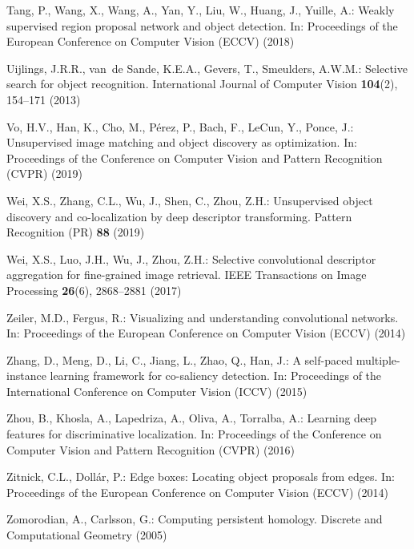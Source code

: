 \documentclass[runningheads]{llncs}
\begin{document}
\begin{thebibliography}{10}
Tang, P., Wang, X., Wang, A., Yan, Y., Liu, W., Huang, J., Yuille, A.: Weakly
  supervised region proposal network and object detection. In: Proceedings of
  the European Conference on Computer Vision ({ECCV}) (2018)

Uijlings, J.R.R., van~de Sande, K.E.A., Gevers, T., Smeulders, A.W.M.:
  Selective search for object recognition. International Journal of Computer
  Vision  \textbf{104}(2),  154--171 (2013)

Vo, H.V., Han, K., Cho, M., P{\'e}rez, P., Bach, F., LeCun, Y., Ponce, J.:
  Unsupervised image matching and object discovery as optimization. In:
  Proceedings of the Conference on Computer Vision and Pattern Recognition
  ({CVPR}) (2019)

Wei, X.S., Zhang, C.L., Wu, J., Shen, C., Zhou, Z.H.: Unsupervised object
  discovery and co-localization by deep descriptor transforming. Pattern
  Recognition (PR)  \textbf{88} (2019)

Wei, X.S., Luo, J.H., Wu, J., Zhou, Z.H.: Selective convolutional descriptor
  aggregation for fine-grained image retrieval. {IEEE} Transactions on Image
  Processing  \textbf{26}(6),  2868–2881 (2017)

Zeiler, M.D., Fergus, R.: Visualizing and understanding convolutional networks.
  In: Proceedings of the European Conference on Computer Vision ({ECCV}) (2014)

Zhang, D., Meng, D., Li, C., Jiang, L., Zhao, Q., Han, J.: A self-paced
  multiple-instance learning framework for co-saliency detection. In:
  Proceedings of the International Conference on Computer Vision ({ICCV})
  (2015)

Zhou, B., Khosla, A., Lapedriza, A., Oliva, A., Torralba, A.: Learning deep
  features for discriminative localization. In: Proceedings of the Conference
  on Computer Vision and Pattern Recognition ({CVPR}) (2016)

Zitnick, C.L., Doll{\'a}r, P.: Edge boxes: Locating object proposals from
  edges. In: Proceedings of the European Conference on Computer Vision ({ECCV})
  (2014)

Zomorodian, A., Carlsson, G.: Computing persistent homology. Discrete and
  Computational Geometry  (2005)

\end{thebibliography}
 
\end{document}
